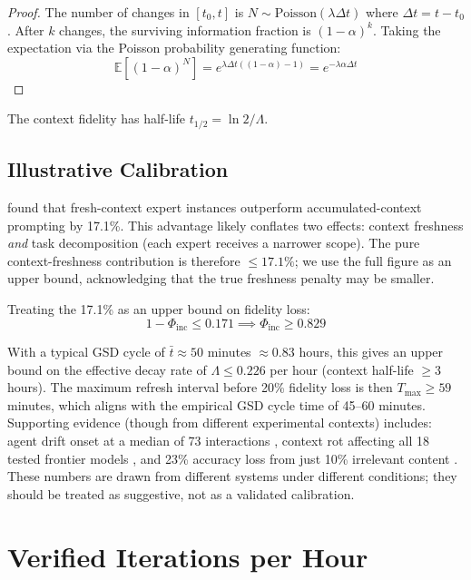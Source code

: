 \documentclass[11pt, a4paper, logo, copyright]{googledeepmind}
\newcommand{\E}{\mathbb{E}}
\begin{document}
\begin{proof}
The number of changes in $[t_0, t]$ is $N \sim \mathrm{Poisson}(\lambda\Delta t)$ where $\Delta t = t - t_0$. After $k$ changes, the surviving information fraction is $(1-\alpha)^k$. Taking the expectation via the Poisson probability generating function:
\[
    \E[(1-\alpha)^N] = e^{\lambda\Delta t((1-\alpha) - 1)} = e^{-\lambda\alpha\Delta t}
\]
\end{proof}

The context fidelity has half-life $t_{1/2} = \ln 2 / \Lambda$.

\subsection{Illustrative Calibration}

\citet{suzgun2024metaprompting} found that fresh-context expert instances outperform accumulated-context prompting by 17.1\%. This advantage likely conflates two effects: context freshness \emph{and} task decomposition (each expert receives a narrower scope). The pure context-freshness contribution is therefore $\leq 17.1\%$; we use the full figure as an upper bound, acknowledging that the true freshness penalty may be smaller.

Treating the 17.1\% as an upper bound on fidelity loss:
\[
    1 - \Phi_{\mathrm{inc}} \leq 0.171 \implies \Phi_{\mathrm{inc}} \geq 0.829
\]

With a typical GSD cycle of $\bar{t} \approx 50$ minutes $\approx 0.83$ hours, this gives an upper bound on the effective decay rate of $\Lambda \leq 0.226$ per hour (context half-life $\geq 3$ hours). The maximum refresh interval before 20\% fidelity loss is then $T_{\max} \geq 59$ minutes, which aligns with the empirical GSD cycle time of 45--60 minutes. Supporting evidence (though from different experimental contexts) includes: agent drift onset at a median of 73 interactions \citep{agentdrift2026}, context rot affecting all 18 tested frontier models \citep{chroma2025rot}, and 23\% accuracy loss from just 10\% irrelevant content \citep{chroma2025rot}. These numbers are drawn from different systems under different conditions; they should be treated as suggestive, not as a validated calibration.


\section{Verified Iterations per Hour}\label{sec:vih}
\end{document}
